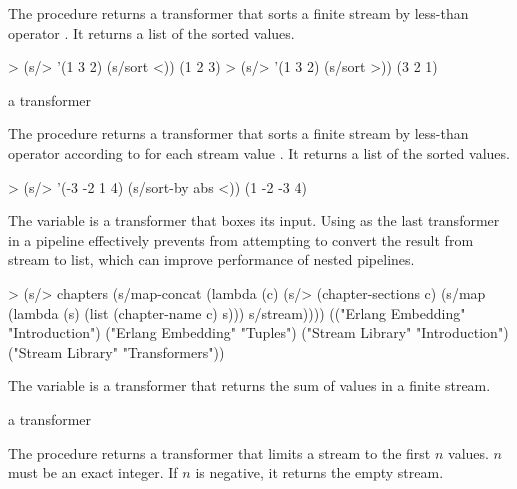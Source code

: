 The  procedure returns a transformer that sorts a finite stream by less-than
operator . It returns a list of the sorted values.

\codebegin
> (s/> '(1 3 2) (s/sort <))
(1 2 3)
> (s/> '(1 3 2) (s/sort >))
(3 2 1)
\codeend

\begin{procedure}
\end{procedure}
\returns{} a transformer

The  procedure returns a transformer that sorts a finite stream by
less-than operator  according to  for each stream
value . It returns a list of the sorted values.

\codebegin
> (s/> '(-3 -2 1 4) (s/sort-by abs <))
(1 -2 -3 4)
\codeend

\begin{variable}
\end{variable}
\antipar

The  variable is a transformer that boxes its input. Using 
as the last transformer in a pipeline effectively prevents  from attempting to
convert the result from stream to list, which can improve performance of nested pipelines.

\codebegin
> (s/> chapters
    (s/map-concat
     (lambda (c)
       (s/> (chapter-sections c)
         (s/map (lambda (s) (list (chapter-name c) s)))
         s/stream))))
(("Erlang Embedding" "Introduction")
 ("Erlang Embedding" "Tuples")
 ("Stream Library" "Introduction")
 ("Stream Library" "Transformers"))
\codeend

\begin{variable}
\end{variable}
\antipar

The  variable is a transformer that returns the sum of values in a finite
stream.

\begin{procedure}
\end{procedure}
\returns{} a transformer

The  procedure returns a transformer that limits a stream to the first $n$
values. $n$ must be an exact integer. If $n$ is negative, it returns the empty stream.

